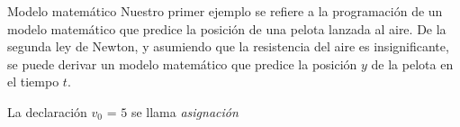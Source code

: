 \begin{frame}
\begin{block}{Modelo matemático}
Nuestro primer ejemplo se refiere a la programación de un modelo matemático que predice la posición de una pelota lanzada al aire. De la segunda ley de Newton, y asumiendo que la resistencia del aire es insignificante, se puede derivar un modelo matemático que predice la posición $y$ de la pelota en el tiempo $t$.
\end{block}

La declaración $v_0$ = $5$ se llama \emph{asignación}
\end{frame}